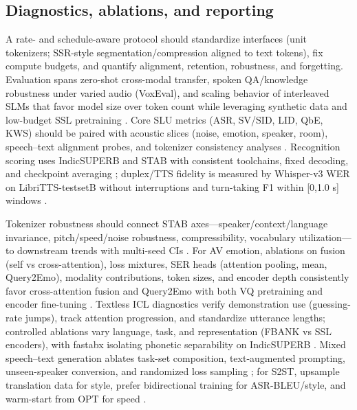 \documentclass{article}
\begin{document}
\subsection{Diagnostics, ablations, and reporting} \label{subsec:Diagnostics, ablations, and reporting}
A rate- and schedule-aware protocol should standardize interfaces (unit tokenizers; SSR-style segmentation/compression aligned to text tokens), fix compute budgets, and quantify alignment, retention, robustness, and forgetting. Evaluation spans zero-shot cross-modal transfer, spoken QA/knowledge robustness under varied audio (VoxEval), and scaling behavior of interleaved SLMs that favor model size over token count while leveraging synthetic data and low-budget SSL pretraining \cite{cui2025voxevalbenchmarkingknowledgeunderstandin,maimon2025scalinganalysisinterleavedspeechtextlang,tan2025ssralignmentawaremodalityconnectorspeech,chen2023reducingbarriersselfsupervisedlearninghu,entry2025towardjointlanguagemodelingspeechunitste}. Core SLU metrics (ASR, SV/SID, LID, QbE, KWS) should be paired with acoustic slices (noise, emotion, speaker, room), speech--text alignment probes, and tokenizer consistency analyses \cite{har-tuv2025pastphoneticacousticspeechtokenizer,turetzky2024lastlanguagemodelawarespeechtokenization,bai2025dmelspeechtokenizationmadesimple,entry2025indicsuperbspeechprocessinguniversalperf,maimon2025salmonsuiteacousticlanguagemodelevaluati}. Recognition scoring uses IndicSUPERB and STAB with consistent toolchains, fixed decoding, and checkpoint averaging \cite{vashishth2024stabspeechtokenizerassessmentbenchmark,entry2025indicsuperbspeechprocessinguniversalperf}; duplex/TTS fidelity is measured by Whisper-v3 WER on LibriTTS-testsetB without interruptions and turn-taking F1 within [0,1.0 s] windows \cite{ma2024languagemodelcanlistenwhilespeaking}.

Tokenizer robustness should connect STAB axes---speaker/context/language invariance, pitch/speed/noise robustness, compressibility, vocabulary utilization---to downstream trends with multi-seed CIs \cite{vashishth2024stabspeechtokenizerassessmentbenchmark}. For AV emotion, ablations on fusion (self vs cross-attention), loss mixtures, SER heads (attention pooling, mean, Query2Emo), modality contributions, token sizes, and encoder depth consistently favor cross-attention fusion and Query2Emo with both VQ pretraining and encoder fine-tuning \cite{sadok2025vectorquantizedmaskedautoencoderaudiovis}. Textless ICL diagnostics verify demonstration use (guessing-rate jumps), track attention progression, and standardize utterance lengths; controlled ablations vary language, task, and representation (FBANK vs SSL encoders), with fastabx isolating phonetic separability on IndicSUPERB \cite{hsu2024exploringcontextlearningtextlessspeechla,poli2025fastabxlibraryefficientcomputationabxdis,entry2025indicsuperbspeechprocessinguniversalperf}. Mixed speech--text generation ablates task-set composition, text-augmented prompting, unseen-speaker conversion, and randomized loss sampling \cite{wu2024speechcomposerunifyingmultiplespeechtask}; for S2ST, upsample translation data for style, prefer bidirectional training for ASR-BLEU/style, and warm-start from OPT for speed \cite{peng2024mslms2stmultitaskspeechlanguagemodeltext}.
\end{document}
